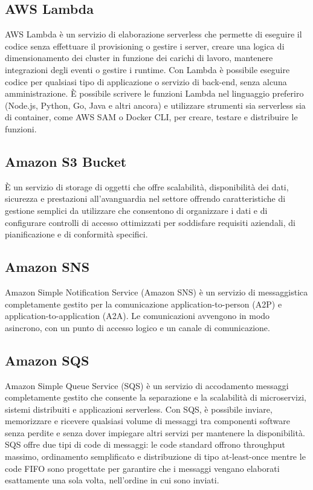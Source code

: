 \subsection{AWS Lambda}
AWS Lambda è un servizio di elaborazione serverless che permette di eseguire il codice senza effettuare il provisioning o gestire i server, creare una logica di dimensionamento dei cluster in funzione dei carichi di lavoro, mantenere integrazioni degli eventi o gestire i runtime. Con Lambda è possibile eseguire codice per qualsiasi tipo di applicazione o servizio di back-end, senza alcuna amministrazione.  È possibile scrivere le funzioni Lambda nel linguaggio preferiro (Node.js, Python, Go, Java e altri ancora) e utilizzare strumenti sia serverless sia di container, come AWS SAM o Docker CLI, per creare, testare e distribuire le funzioni.
\subsection{Amazon S3 Bucket}
È un servizio di storage di oggetti che offre scalabilità, disponibilità dei dati, sicurezza e prestazioni all'avanguardia nel settore offrendo caratteristiche di gestione semplici da utilizzare che consentono di organizzare i dati e di configurare controlli di accesso ottimizzati per soddisfare requisiti aziendali, di pianificazione e di conformità specifici.
\subsection{Amazon SNS}
Amazon Simple Notification Service (Amazon SNS) è un servizio di messaggistica completamente gestito per la comunicazione application-to-person (A2P) e application-to-application (A2A).
Le comunicazioni avvengono in modo asincrono, con un punto di accesso logico e un canale di comunicazione. 
\subsection{Amazon SQS}
Amazon Simple Queue Service (SQS) è un servizio di accodamento messaggi completamente gestito che consente la separazione e la scalabilità di microservizi, sistemi distribuiti e applicazioni serverless. Con SQS, è possibile inviare, memorizzare e ricevere qualsiasi volume di messaggi tra componenti software senza perdite e senza dover impiegare altri servizi per mantenere la disponibilità. 
SQS offre due tipi di code di messaggi: le code standard offrono throughput massimo, ordinamento semplificato e distribuzione di tipo at-least-once mentre le code FIFO sono progettate per garantire che i messaggi vengano elaborati esattamente una sola volta, nell'ordine in cui sono inviati.
